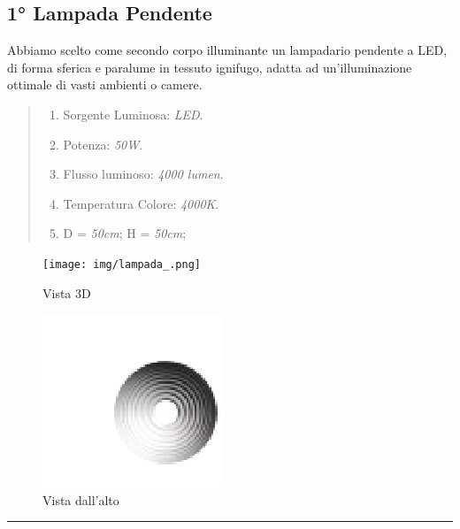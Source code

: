 \documentclass[italian, 12pt, a4paper]{article}
\begin{document}
\subsection{1° Lampada Pendente}
Abbiamo scelto come secondo corpo illuminante un lampadario pendente a LED, di forma sferica e paralume in tessuto ignifugo, adatta ad un'illuminazione ottimale di vasti ambienti o camere.
\begin{quote}
    \begin{enumerate}
        \item Sorgente Luminosa: \emph{LED}.
        \item Potenza: \emph{50W}.
        \item Flusso luminoso: \emph{4000 lumen}.
        \item Temperatura Colore: \emph{4000K}.
        \item D = \emph{50cm}; H = \emph{50cm};
    \end{enumerate}
    \vspace{-40pt}
\end{quote}
\begin{figure}[h!]
    \centering
    \begin{minipage}{0.45\textwidth}
        \centering
        \texttt{[image: img/lampada\_.png]} %
        \caption{Vista 3D}
    \end{minipage} \hfill
    \begin{minipage}{0.45\textwidth}
        \centering
        \includegraphics[width=\linewidth]{img/lampada-top.png} %
        \caption{Vista dall'alto}
    \end{minipage}
\end{figure}
\hrule
\clearpage
\end{document}
